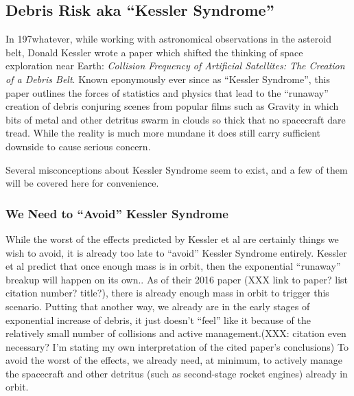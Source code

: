 \subsection{Debris Risk aka ``Kessler Syndrome''}

In 197whatever, while working with astronomical observations in the
asteroid belt, Donald Kessler wrote a paper which shifted the thinking
of space exploration near Earth: {\it Collision Frequency of
  Artificial Satellites: The Creation of a Debris
  Belt}.\cite{kessler-og} Known eponymously ever since as ``Kessler
Syndrome'', this paper outlines the forces of statistics and physics
that lead to the ``runaway'' creation of debris conjuring scenes from
popular films such as Gravity in which bits of metal and other
detritus swarm in clouds so thick that no spacecraft dare tread.
While the reality is much more mundane it does still carry sufficient
downside to cause serious concern.

Several misconceptions about Kessler Syndrome seem to exist, and a few
of them will be covered here for convenience.

\subsubsection{We Need to ``Avoid'' Kessler Syndrome}
While the worst of the effects predicted by Kessler et al are
certainly things we wish to avoid, it is already too late to ``avoid''
Kessler Syndrome entirely.  Kessler et al predict that once enough
mass is in orbit, then the exponential ``runaway'' breakup will happen
on its own.\cite[xxx]{kessler-reunion}.  As of their 2016 paper (XXX
link to paper?  list citation number?  title?), there is already
enough mass in orbit to trigger this
scenario.\cite[xxx]{kessler-reunion} Putting that another way, we
already are in the early stages of exponential increase of debris, it
just doesn't ``feel'' like it because of the relatively small number
of collisions and active management.(XXX: citation even necessary?
I'm stating my own interpretation of the cited paper's conclusions) To
avoid the worst of the effects, we already need, at minimum, to
actively manage the spacecraft and other detritus (such as
second-stage rocket engines) already in
orbit.\cite[xxx]{kessler-reunion}

